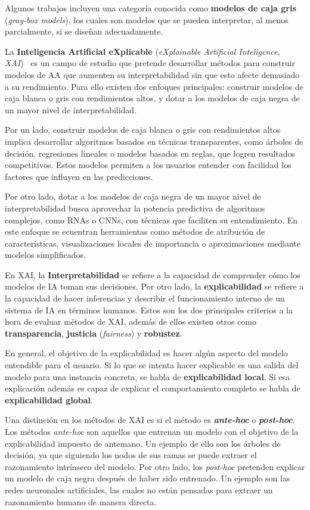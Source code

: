Algunos trabajos incluyen una categoría conocida como \textbf{modelos de caja gris} (\textit{gray-box models}), los cuales son modelos que se pueden interpretar, al menos parcialmente, si se diseñan adecuadamente.


La \textbf{Inteligencia Artificial eXplicable} (\textit{eXplainable Artificial Inteligence, XAI})~\cite{XAIManifesto, XAICONCEPTS} es un campo de estudio que pretende desarrollar métodos para construir modelos de AA que aumenten su interpretabilidad sin que esto afecte demasiado a su rendimiento. Para ello existen dos enfoques principales: construir modelos de caja blanca o gris con rendimientos altos, y dotar a los modelos de caja negra de un mayor nivel de interpretabilidad.

Por un lado, construir modelos de caja blanca o gris con rendimientos altos implica desarrollar algoritmos basados en técnicas transparentes, como árboles de decisión, regresiones lineales o modelos basados en reglas, que logren resultados competitivos. Estos modelos permiten a los usuarios entender con facilidad los factores que influyen en las predicciones.

Por otro lado, dotar a los modelos de caja negra de un mayor nivel de interpretabilidad busca aprovechar la potencia predictiva de algoritmos complejos, como RNAs o CNNs, con técnicas que faciliten su entendimiento. En este enfoque se ecuentran herramientas como métodos de atribución de características, visualizaciones locales de importancia o aproximaciones mediante modelos simplificados.

En XAI, la \textbf{Interpretabilidad} se refiere a la capacidad de comprender cómo los modelos de IA toman sus decisiones. Por otro lado, la \textbf{explicabilidad} se refiere a la capacidad de hacer inferencias y describir el funcionamiento interno de un sistema de IA en términos humanos. Estos son los dos principales criterios a la hora de evaluar métodos de XAI, además de ellos existen otros como \textbf{transparencia}, \textbf{justicia} (\textit{fairness}) y \textbf{robustez}. 

En general, el objetivo de la explicabilidad es hacer algún aspecto del modelo entendible para el usuario. Si lo que se intenta hacer explicable es una salida del modelo para una instancia concreta, se habla de \textbf{explicabilidad local}. Si esa explicación además es capaz de explicar el comportamiento completo se habla de \textbf{explicabilidad global}.

Una distinción en los métodos de XAI es si el método es \textit{\textbf{ante-hoc}} o \textit{\textbf{post-hoc}}. Los métodos \textit{ante-hoc} son aquellos que entrenan un modelo con el objetivo de la explicabilidad impuesto de antemano. Un ejemplo de ello son los árboles de decisión, ya que siguiendo los nodos de sus ramas se puede extraer el razonamiento intrínseco del modelo. Por otro lado, los \textit{post-hoc} pretenden explicar un modelo de caja negra después de haber sido entrenado. Un ejemplo son las redes neuronales artificiales, las cuales no están pensadas para extraer un razonamiento humano de manera directa. 


